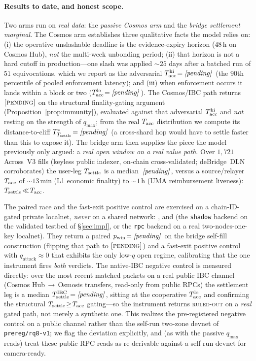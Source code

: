 \paragraph{Results to date, and honest scope.}
Two arms run on \emph{real data}: the \emph{passive Cosmos arm} and the \emph{bridge settlement
marginal}. The Cosmos arm establishes three qualitative facts the model relies on: (i) the operative
unslashable deadline is the evidence-expiry horizon ($48$\,h on Cosmos Hub), \emph{not} the multi-week
unbonding period; (ii) that horizon is not a hard cutoff in production---one slash was applied
${\sim}25$ days after a batched run of $51$ equivocations, which we report as the adversarial
$T_{\mathrm{acc}}^{\mathrm{hi}}\!=\!\,\textit{[pending]}\,$ (the $90$th percentile of pooled enforcement latency);
and (iii) when enforcement occurs it lands within a block or two ($T_{\mathrm{acc}}^{\mathrm{lo}}\!=\!\,\textit{[pending]}\,$).
The Cosmos/IBC path returns $\textsc{[pending]}$ on the structural finality-gating argument
(Proposition~\ref{prop:immunity}), evaluated against that adversarial $T_{\mathrm{acc}}^{\mathrm{hi}}$ and
\emph{not} resting on the strength of $q_{\max}$; from the real $T_{\mathrm{acc}}$ distribution we compute its
distance-to-cliff $T^{*}_{T_{\mathrm{settle}}}\!=\!\,\textit{[pending]}\,$ (a cross-shard hop would have to settle
faster than this to expose it). The bridge arm then supplies the piece the model previously only
argued: a \emph{real open window on a real value path}. Over $1{,}721$ Across~V3 fills (keyless public
indexer, on-chain cross-validated; deBridge~DLN corroborates) the user-leg $T_{\mathrm{settle}}$ is a median
$\,\textit{[pending]}\,$, versus a source/relayer $T_{\mathrm{acc}}$ of ${\sim}13$\,min (L1 economic finality) to
${\sim}1$\,h (UMA reimbursement liveness): $T_{\mathrm{settle}}\!\ll\!T_{\mathrm{acc}}$.

The paired race and the fast-exit positive control are exercised on a chain-ID-gated private localnet,
\emph{never} on a shared network: \ArtifactPairedMode, and \ArtifactPosCtrlMode (the \texttt{shadow}
backend on the validated testbed of \S\ref{sec:impl}, or the \texttt{rpc} backend on a real
two-nodes-one-key localnet). They return a paired
$p_{\mathrm{win}}\!=\!\,\textit{[pending]}\,$ on the bridge self-fill construction (flipping that path to
$\textsc{[pending]}$) and a fast-exit positive control with $q_{\mathrm{attack}}\!\approx\!0$ that
exhibits the only low-$q$ open regime, calibrating that the one instrument fires \emph{both} verdicts.
The native-IBC negative control is measured directly: over the most recent matched packets on a real
public IBC channel (Cosmos Hub\,$\to$\,Osmosis transfers, read-only from public RPCs) the settlement
leg is a median $T_{\mathrm{settle}}^{\mathrm{IBC}}\!=\!\,\textit{[pending]}\,$, sitting at the cooperative
$T_{\mathrm{acc}}^{\mathrm{lo}}$ and confirming the structural $T_{\mathrm{settle}}\!\ge\!T_{\mathrm{acc}}$ gating---so the instrument
returns \textsc{ruled-out} on a \emph{real} gated path, not merely a synthetic one. This realizes the
pre-registered negative control on a public channel rather than the self-run two-zone devnet of
\texttt{prereg/rq8-v1}; we flag the deviation explicitly, and (as with the passive $q_{\max}$ reads)
treat these public-RPC reads as re-derivable against a self-run devnet for camera-ready.

